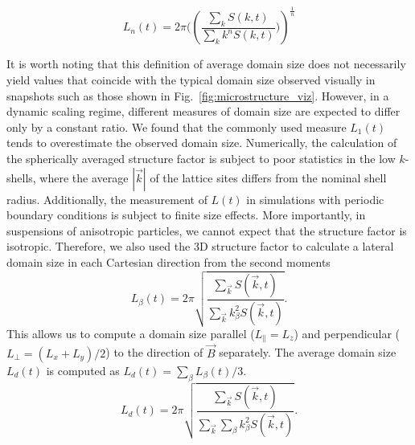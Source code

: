 \begin{equation}
L_n(t) = 2 \pi (\left( \frac{\sum_k S(k, t)}{\sum_k k^n S(k, t)} )\right)^{\frac{1}{n}}
\end{equation}

It is worth noting that this definition of average domain
size does not necessarily yield values that coincide with the typical
domain size observed visually in snapshots such as those shown in
Fig.~\ref{fig:microstructure_viz}. However, in a dynamic
scaling regime, different measures of domain size are expected to differ
only by a constant ratio. We found that the commonly used measure
\(L_1(t)\) tends to overestimate the observed domain size. Numerically,
the calculation of the spherically averaged structure factor is subject
to poor statistics in the low \(k\)-shells, where the average
\(|\vec{k}|\) of the lattice sites differs from the nominal shell
radius. Additionally, the measurement of \(L(t)\) in simulations with
periodic boundary conditions is subject to finite size effects. More
importantly, in suspensions of anisotropic particles, we cannot expect
that the structure factor is isotropic. Therefore, we also used the 3D
structure factor to calculate a lateral domain size in each Cartesian
direction from the second moments
\cite{jansen_bijels_2011,gunther_timescales_2014}
%
\begin{equation}
L_\beta(t)=2\pi\sqrt{\frac{\sum_{\vec{k}}S(\vec{k},t)}{\sum_{\vec{k}}k_\beta^2 S(\vec{k},t)}} .
\end{equation}
%
This allows us to compute a domain size parallel
(\(L_\parallel=L_z\)) and perpendicular (\(L_\perp=(L_x+L_y)/2\)) to the
direction of \(\vec{B}\) separately. The average domain size \(L_d(t)\)
is computed as \(L_d(t)=\sum_\beta L_\beta(t) / 3\).
%
\begin{equation}
L_d(t)=2\pi\sqrt{\frac{\sum_{\vec{k}}S(\vec{k},t)}{\sum_{\vec{k}}\sum_\beta k_\beta^2 S(\vec{k},t)}} .
\end{equation}
%
%


